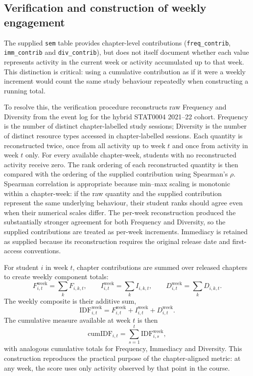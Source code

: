 \documentclass[11pt,a4paper]{article}
\begin{document}
\subsection{Verification and construction of weekly engagement}
The supplied \texttt{sem} table provides chapter-level contributions
(\texttt{freq\_contrib}, \texttt{imm\_contrib} and \texttt{div\_contrib}), but
does not itself document whether each value represents activity in the current
week or activity accumulated up to that week. This distinction is critical:
using a cumulative contribution as if it were a weekly increment would count the
same study behaviour repeatedly when constructing a running total.

To resolve this, the verification procedure reconstructs raw Frequency and
Diversity from the event log for the hybrid STAT0004 2021--22 cohort. Frequency
is the number of distinct chapter-labelled study sessions; Diversity is the
number of distinct resource types accessed in chapter-labelled sessions. Each
quantity is reconstructed twice, once from all activity up to week $t$ and once
from activity in week $t$ only. For every available chapter-week, students with
no reconstructed activity receive zero. The rank ordering of each reconstructed
quantity is then compared with the ordering of the supplied contribution using
Spearman's $\rho$. Spearman correlation is appropriate because min--max scaling
is monotonic within a chapter-week: if the raw quantity and the supplied
contribution represent the same underlying behaviour, their student ranks should
agree even when their numerical scales differ. The per-week reconstruction
produced the substantially stronger agreement for both Frequency and Diversity,
so the supplied contributions are treated as per-week increments. Immediacy is
retained as supplied because its reconstruction requires the original release
date and first-access conventions.

For student $i$ in week $t$, chapter contributions are summed over released
chapters to create weekly component totals:
\[
F_{i,t}^{\mathrm{week}} = \sum_k F_{i,k,t}, \qquad
I_{i,t}^{\mathrm{week}} = \sum_k I_{i,k,t}, \qquad
D_{i,t}^{\mathrm{week}} = \sum_k D_{i,k,t}.
\]
The weekly composite is their additive sum,
\[
\mathrm{IDF}_{i,t}^{\mathrm{week}} =
F_{i,t}^{\mathrm{week}} + I_{i,t}^{\mathrm{week}} +
D_{i,t}^{\mathrm{week}}.
\]
The cumulative measure available at week $t$ is then
\[
\mathrm{cumIDF}_{i,t} = \sum_{s=1}^{t}\mathrm{IDF}_{i,s}^{\mathrm{week}},
\]
with analogous cumulative totals for Frequency, Immediacy and Diversity. This
construction reproduces the practical purpose of the chapter-aligned metric:
at any week, the score uses only activity observed by that point in the course.
\end{document}
